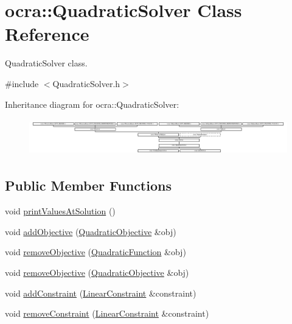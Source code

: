 \hypertarget{classocra_1_1QuadraticSolver}{}\section{ocra\+:\+:Quadratic\+Solver Class Reference}
\label{classocra_1_1QuadraticSolver}


Quadratic\+Solver class.  




{\ttfamily \#include $<$Quadratic\+Solver.\+h$>$}

Inheritance diagram for ocra\+:\+:Quadratic\+Solver\+:\begin{figure}[H]
\begin{center}
\leavevmode
\includegraphics[height=1.623188cm]{d7/dab/classocra_1_1QuadraticSolver}
\end{center}
\end{figure}
\subsection*{Public Member Functions}
\begin{DoxyCompactItemize}
\item 
void \hyperlink{classocra_1_1QuadraticSolver_a848c996e3a918c6cb0db3edf66c04cc1}{print\+Values\+At\+Solution} ()
\end{DoxyCompactItemize}
{\bf }\par
\begin{DoxyCompactItemize}
\item 
void \hyperlink{classocra_1_1QuadraticSolver_af8e4dba5faceb48ae3c355bd7fcf7073}{add\+Objective} (\hyperlink{namespaceocra_a0b50673710f087c0f1733aefd1a8e0f7}{Quadratic\+Objective} \&obj)
\item 
void \hyperlink{classocra_1_1QuadraticSolver_aefd3a7556918d2073ab9ae8119f9f60c}{remove\+Objective} (\hyperlink{classocra_1_1QuadraticFunction}{Quadratic\+Function} \&obj)
\item 
void \hyperlink{classocra_1_1QuadraticSolver_a9b1f718481a8200d2135983fc247f146}{remove\+Objective} (\hyperlink{namespaceocra_a0b50673710f087c0f1733aefd1a8e0f7}{Quadratic\+Objective} \&obj)
\end{DoxyCompactItemize}

{\bf }\par
\begin{DoxyCompactItemize}
\item 
void \hyperlink{classocra_1_1QuadraticSolver_a0cf6c866db56031b48a447aa310bad94}{add\+Constraint} (\hyperlink{namespaceocra_ae8b87cf4099be3efc3b410019ad2046e}{Linear\+Constraint} \&constraint)
\item 
void \hyperlink{classocra_1_1QuadraticSolver_ab09f78e724adfb76c6b009c946404113}{remove\+Constraint} (\hyperlink{namespaceocra_ae8b87cf4099be3efc3b410019ad2046e}{Linear\+Constraint} \&constraint)
\end{DoxyCompactItemize}

